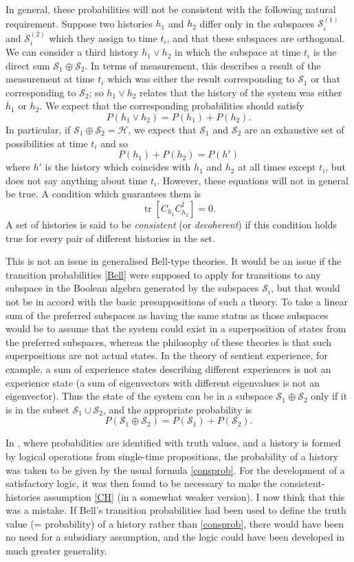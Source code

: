 \documentclass[12pt,reqno]{article}
\newcommand{\be}{\begin{equation}}
\newcommand{\ee}{\end{equation}}
\renewcommand{\(}{\left(}
\renewcommand{\)}{\right)}
\renewcommand{\.}{\centerdot}
\renewcommand{\S}{\mathcal{S}}
\renewcommand{\H}{\mathcal{H}}
\newcommand{\1}{\mathbf{1}}
\newcommand{\<}{\langle}
\renewcommand{\>}{\rangle}
\newcommand{\tr}{\operatorname{tr}}
\theoremstyle{definition}
\theoremstyle{remark}
\numberwithin{equation}{section}
\begin{document}
In general, these probabilities will not be consistent with the following natural requirement. Suppose two histories $h_1$ and $h_2$ differ only in the subspaces $\S^{(1)}_i$ and $\S^{(2)}_i$ which they assign to time $t_i$, and that these subspaces are orthogonal. We can consider a third history $h_1\lor h_2$ in which the subspace at time $t_i$ is the direct sum $\S_1\oplus\S_2$. In terms of measurement, this describes a result of the measurement at time $t_i$ which was either the result corresponding to $\S_1$ or that corresponding to $\S_2$; so $h_1\lor h_2$ relates that the history of the system was either $h_1$ or $h_2$. We expect that the corresponding probabilities should satisfy
\[
P(h_1\lor h_2) = P(h_1) + P(h_2).
\]
In particular, if $\S_1\oplus\S_2 = \H$, we expect that $\S_1$ and $\S_2$ are an exhaustive set of possibilities at time $t_i$ and so
\[
P(h_1) + P(h_2) = P(h')
\]
where $h'$ is the history which coincides with $h_1$ and $h_2$ at all times except $t_i$, but does not say anything about time $t_i$.
However, these equations will not in general be true. A condition which guarantees them is
\be\label{CH}
\tr[C_{h_1} C_{h_2}^\dagger] = 0.
\ee
A set of histories is said to be \emph{consistent} (or \emph{decoherent}) if this condition holds true for every pair of different histories in the set.

This is not an issue in generalised Bell-type theories. It would be an issue if the transition probabilities \eqref{Bell} were supposed to apply for transitions to any subspace in the Boolean algebra generated by the subspaces $\S_i$, but that would not be in accord with the basic presuppositions of such a theory. To take a linear sum of the preferred subspaces as having the same status as those subspaces would be to assume that the system could exist in a superposition of states from the preferred subspaces, whereas the philosophy of these theories is that such superpositions are not actual states. In the theory of sentient experience, for example, a sum of experience states describing different experiences is not an experience state (a sum of eigenvectors with different eigenvalues is not an eigenvector). Thus the state of the system can be in a subspace $\S_1\oplus\S_2$ only if it is in the subset $\S_1\cup\S_2$, and the appropriate probability is 
\[
P(\S_1\oplus\S_2) = P(\S_1) + P(\S_2).
\]

In \cite{logicfuture}, where probabilities are identified with truth values, and a history is formed by logical operations from single-time propositions, the probability of a history was taken to be given by the usual formula \eqref{consprob}. For the development of a satisfactory logic, it was then found to be necessary to make the consistent-histories assumption \eqref{CH} (in a somewhat weaker version). I now think that this was a mistake. If Bell's transition probabilities had been used to define the truth value (= probability) of a history rather than \eqref{consprob}, there would have been no need for a subsidiary assumption, and the logic could have been developed in much greater generality.
\end{document}
